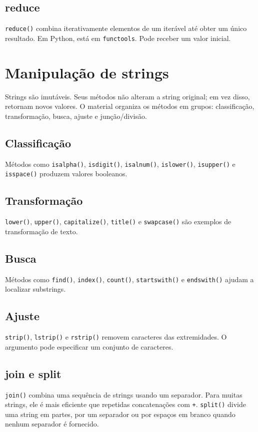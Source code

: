 \documentclass[11pt,a4paper]{article}
\begin{document}
\subsection{reduce}
\texttt{reduce()} combina iterativamente elementos de um iterável até obter um único resultado. Em Python, está em \texttt{functools}. Pode receber um valor inicial.

\section{Manipulação de strings}
Strings são imutáveis. Seus métodos não alteram a string original; em vez disso, retornam novos valores. O material organiza os métodos em grupos: classificação, transformação, busca, ajuste e junção/divisão.

\subsection{Classificação}
Métodos como \texttt{isalpha()}, \texttt{isdigit()}, \texttt{isalnum()}, \texttt{islower()}, \texttt{isupper()} e \texttt{isspace()} produzem valores booleanos.

\subsection{Transformação}
\texttt{lower()}, \texttt{upper()}, \texttt{capitalize()}, \texttt{title()} e \texttt{swapcase()} são exemplos de transformação de texto.

\subsection{Busca}
Métodos como \texttt{find()}, \texttt{index()}, \texttt{count()}, \texttt{startswith()} e \texttt{endswith()} ajudam a localizar substrings.

\subsection{Ajuste}
\texttt{strip()}, \texttt{lstrip()} e \texttt{rstrip()} removem caracteres das extremidades. O argumento pode especificar um conjunto de caracteres.

\subsection{join e split}
\texttt{join()} combina uma sequência de strings usando um separador. Para muitas strings, ele é mais eficiente que repetidas concatenações com \texttt{+}. \texttt{split()} divide uma string em partes, por um separador ou por espaços em branco quando nenhum separador é fornecido.
\end{document}
